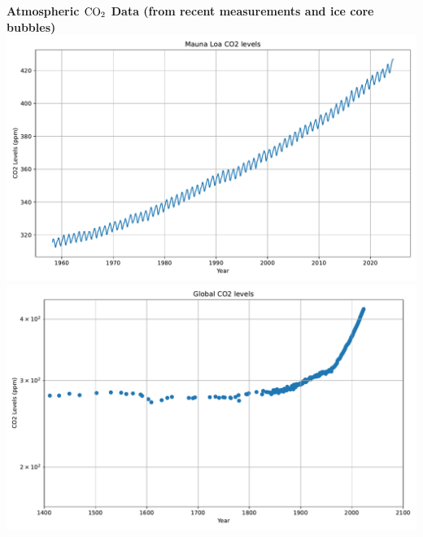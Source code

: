 \documentclass[12pt]{article}
\begin{document}
\newpage
\begin{center}
{\bf Atmospheric ${\rm CO}_2$ Data (from recent measurements and ice core bubbles)}\\[12pt]

\includegraphics[width=\textwidth]{images/mauna-loa-CO2_monthly_1958-2024}\\[24pt]
\includegraphics[width=\textwidth]{images/global-CO2_paleo_1400-2100}

\end{center}
\end{document}
